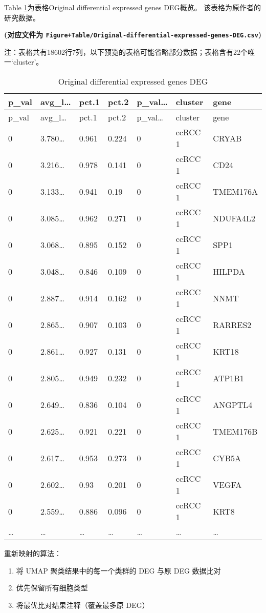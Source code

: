 \documentclass[
]{article}
\providecommand{\tightlist}{%
  \setlength{\itemsep}{0pt}\setlength{\parskip}{0pt}}
\begin{document}
Table \ref{tab:Original-differential-expressed-genes-DEG}为表格Original differential expressed genes DEG概览。
该表格为原作者的研究数据。

\textbf{(对应文件为 \texttt{Figure+Table/Original-differential-expressed-genes-DEG.csv})}

\begin{center}\begin{tcolorbox}[colback=gray!10, colframe=gray!50, width=0.9\linewidth, arc=1mm, boxrule=0.5pt]注：表格共有18602行7列，以下预览的表格可能省略部分数据；表格含有22个唯一`cluster'。
\end{tcolorbox}
\end{center}

\begin{longtable}[]{@{}lllllll@{}}
\caption{\label{tab:Original-differential-expressed-genes-DEG}Original differential expressed genes DEG}\tabularnewline
\toprule
p\_val & avg\_l\ldots{} & pct.1 & pct.2 & p\_val\ldots{} & cluster & gene\tabularnewline
\midrule
\endfirsthead
\toprule
p\_val & avg\_l\ldots{} & pct.1 & pct.2 & p\_val\ldots{} & cluster & gene\tabularnewline
\midrule
\endhead
0 & 3.780\ldots{} & 0.961 & 0.224 & 0 & ccRCC 1 & CRYAB\tabularnewline
0 & 3.216\ldots{} & 0.978 & 0.141 & 0 & ccRCC 1 & CD24\tabularnewline
0 & 3.133\ldots{} & 0.941 & 0.19 & 0 & ccRCC 1 & TMEM176A\tabularnewline
0 & 3.085\ldots{} & 0.962 & 0.271 & 0 & ccRCC 1 & NDUFA4L2\tabularnewline
0 & 3.068\ldots{} & 0.895 & 0.152 & 0 & ccRCC 1 & SPP1\tabularnewline
0 & 3.048\ldots{} & 0.846 & 0.109 & 0 & ccRCC 1 & HILPDA\tabularnewline
0 & 2.887\ldots{} & 0.914 & 0.162 & 0 & ccRCC 1 & NNMT\tabularnewline
0 & 2.865\ldots{} & 0.907 & 0.103 & 0 & ccRCC 1 & RARRES2\tabularnewline
0 & 2.861\ldots{} & 0.927 & 0.131 & 0 & ccRCC 1 & KRT18\tabularnewline
0 & 2.805\ldots{} & 0.949 & 0.232 & 0 & ccRCC 1 & ATP1B1\tabularnewline
0 & 2.649\ldots{} & 0.836 & 0.104 & 0 & ccRCC 1 & ANGPTL4\tabularnewline
0 & 2.625\ldots{} & 0.921 & 0.221 & 0 & ccRCC 1 & TMEM176B\tabularnewline
0 & 2.617\ldots{} & 0.953 & 0.273 & 0 & ccRCC 1 & CYB5A\tabularnewline
0 & 2.602\ldots{} & 0.93 & 0.201 & 0 & ccRCC 1 & VEGFA\tabularnewline
0 & 2.559\ldots{} & 0.886 & 0.096 & 0 & ccRCC 1 & KRT8\tabularnewline
\ldots{} & \ldots{} & \ldots{} & \ldots{} & \ldots{} & \ldots{} & \ldots{}\tabularnewline
\bottomrule
\end{longtable}

重新映射的算法：

\begin{enumerate}
\def\labelenumi{\arabic{enumi}.}
\tightlist
\item
  将 UMAP 聚类结果中的每一个类群的 DEG 与原 DEG 数据比对
\item
  优先保留所有细胞类型
\item
  将最优比对结果注释（覆盖最多原 DEG）
\end{enumerate}
\end{document}
